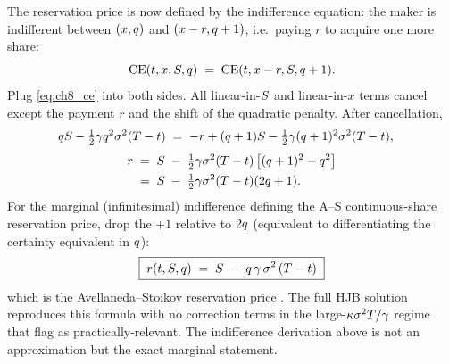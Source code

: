 The reservation price is now defined by the indifference equation:
the maker is indifferent between $(x, q)$ and $(x - r, q + 1)$,
i.e.\ paying $r$ to acquire one more share:
\begin{equation}
  \mathrm{CE}(t, x, S, q)
  \;=\; \mathrm{CE}(t, x - r, S, q + 1).
  \label{eq:ch8_indiff}
\end{equation}
Plug \eqref{eq:ch8_ce} into both sides. All linear-in-$S$ and
linear-in-$x$ terms cancel except the payment $r$ and the shift of
the quadratic penalty. After cancellation,
\begin{align}
  q S - \tfrac{1}{2}\gamma q^2 \sigma^2 (T-t)
  \;&=\;
  -r + (q+1)S
  - \tfrac{1}{2}\gamma (q+1)^2 \sigma^2(T-t),
\end{align}
\begin{align}
  r \;&=\; S \;-\; \tfrac{1}{2}\gamma \sigma^2 (T-t)\,
          \bigl[(q+1)^2 - q^2\bigr] \nonumber\\
  \;&=\; S \;-\; \tfrac{1}{2}\gamma \sigma^2 (T-t)(2q+1).
\end{align}
For the marginal (infinitesimal) indifference defining the A--S
continuous-share reservation price, drop the $+1$ relative to
$2q$ (equivalent to differentiating the certainty equivalent
in $q$):
\begin{equation}
  \boxed{\;
    r(t, S, q)
    \;=\; S \;-\; q \, \gamma \, \sigma^2 \,(T - t)\;}
  \label{eq:ch8_r_closedform}
\end{equation}
which is the Avellaneda--Stoikov reservation price
. The full HJB solution reproduces this formula
with no correction terms in the large-$\kappa\sigma^2T/\gamma$
regime that \citeCartea{} flag as practically-relevant. The
indifference derivation above is not an approximation but the
exact marginal statement.

